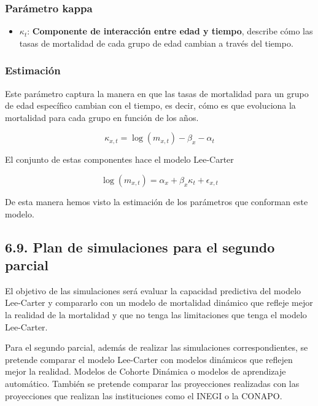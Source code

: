 \documentclass[
]{article}
\providecommand{\tightlist}{%
  \setlength{\itemsep}{0pt}\setlength{\parskip}{0pt}}
\begin{document}
\clearpage

\hypertarget{paruxe1metro-kappa}{%
\subsubsection{Parámetro kappa}\label{paruxe1metro-kappa}}

\begin{itemize}
\tightlist
\item
  \(\kappa_t\): \textbf{Componente de interacción entre edad y tiempo},
  describe cómo las tasas de mortalidad de cada grupo de edad cambian a
  través del tiempo.
\end{itemize}

\hypertarget{estimaciuxf3n-2}{%
\subsubsection{Estimación}\label{estimaciuxf3n-2}}

Este parámetro captura la manera en que las tasas de mortalidad para un
grupo de edad específico cambian con el tiempo, es decir, cómo es que
evoluciona la mortalidad para cada grupo en función de los años.

\[
\kappa_{x,t} = \log(m_{x,t}) - \beta_x - \alpha_t
\]

El conjunto de estas componentes hace el modelo Lee-Carter

\[
\log(m_{x,t}) = \alpha_x + \beta_x \kappa_t + \epsilon_{x,t}
\]

De esta manera hemos visto la estimación de los parámetros que conforman
este modelo.

\hypertarget{plan-de-simulaciones-para-el-segundo-parcial}{%
\subsection{6.9. Plan de simulaciones para el segundo
parcial}\label{plan-de-simulaciones-para-el-segundo-parcial}}

El objetivo de las simulaciones será evaluar la capacidad predictiva del
modelo Lee-Carter y compararlo con un modelo de mortalidad dinámico que
refleje mejor la realidad de la mortalidad y que no tenga las
limitaciones que tenga el modelo Lee-Carter.

Para el segundo parcial, además de realizar las simulaciones
correspondientes, se pretende comparar el modelo Lee-Carter con modelos
dinámicos que reflejen mejor la realidad. Modelos de Cohorte Dinámica o
modelos de aprendizaje automático. También se pretende comparar las
proyecciones realizadas con las proyecciones que realizan las
instituciones como el INEGI o la CONAPO.
\end{document}
